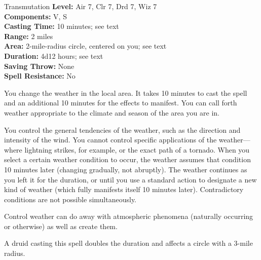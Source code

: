 {Transmutation}
{
	\textbf{Level:}
	Air 7, Clr 7, Drd 7, Wiz 7\\
	\textbf{Components:}
	V, S\\
	\textbf{Casting Time:}
	10 minutes; see text\\
	\textbf{Range:}
	2 miles\\
	\textbf{Area:}
	2-mile-radius circle, centered on you; see text\\
	\textbf{Duration:}
	4d12 hours; see text\\
	\textbf{Saving Throw:}
	None\\
	\textbf{Spell Resistance:}
	No\\
}
{
	You change the weather in the local area. It takes 10 minutes to cast the spell and an additional 10 minutes for the effects to manifest. You can call forth weather appropriate to the climate and season of the area you are in.

	You control the general tendencies of the weather, such as the direction and intensity of the wind. You cannot control specific applications of the weather---where lightning strikes, for example, or the exact path of a tornado. When you select a certain weather condition to occur, the weather assumes that condition 10 minutes later (changing gradually, not abruptly). The weather continues as you left it for the duration, or until you use a standard action to designate a new kind of weather (which fully manifests itself 10 minutes later). Contradictory conditions are not possible simultaneously.

	Control weather can do away with atmospheric phenomena (naturally occurring or otherwise) as well as create them.

	A druid casting this spell doubles the duration and affects a circle with a 3-mile radius.

}
